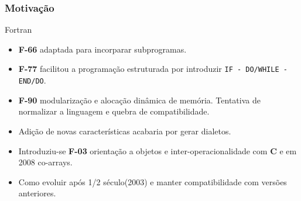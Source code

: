 \documentclass[]{beamer}
\begin{document}
	\begin{frame}
		\frametitle{Motivação}
		\begin{block}{Fortran}
			\begin{itemize}
				\item \textbf{F-66} adaptada para incorparar subprogramas.
				
				\item \textbf{F-77} facilitou a programação estruturada por introduzir \texttt{IF - DO/WHILE - END/DO}.
				
				
				\item \textbf{F-90} modularização e alocação dinâmica de memória. Tentativa de normalizar a linguagem e quebra de compatibilidade. 
				
				\item Adição de novas características acabaria por gerar dialetos.
				
				\item Introduziu-se \textbf{F-03} orientação a objetos  e inter-operacionalidade com \textbf{C} e em 2008 co-arrays.
				
				\item Como evoluir após 1/2 século(2003) e manter compatibilidade com versões anteriores.
				
				
				
			\end{itemize}
		\end{block}
	\end{frame}
	
		
	

	
%			



\end{document}
